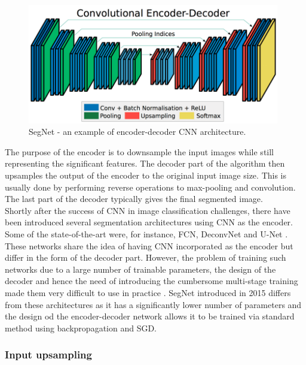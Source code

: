 \vspace{4mm}
\begin{figure}[h]
	\begin{center}
		\includegraphics*[width=11cm, keepaspectratio]{obr/segnet.png}
	\end{center}
	\vspace{4mm}
	\caption{SegNet - an example of encoder-decoder CNN architecture. \cite{segnet}} 
	\label{encoder}
\end{figure}

The purpose of the encoder is to downsample the input images while still representing the significant features. The decoder part of the algorithm then upsamples the output of the encoder to the original input image size. This is usually done by performing reverse operations to max-pooling and convolution. The last part of the decoder typically gives the final segmented image. \\

Shortly after the success of CNN in image classification challenges, there have been introduced several segmentation architectures using CNN as the encoder. Some of the state-of-the-art were, for instance, FCN, DeconvNet and U-Net \cite{segnet}. These networks share the idea of having CNN incorporated as the encoder but differ in the form
of the decoder part. However, the problem of training such networks due to a large number of trainable parameters, the design of the decoder and hence the need of introducing the cumbersome multi-stage training made them very difficult to use in practice \cite{segnet}. SegNet \cite{segnet} introduced in 2015 differs from these architectures as it has a significantly lower number of parameters and the design od the encoder-decoder network allows it to be trained via standard method using backpropagation and SGD.

\subsubsection{Input upsampling}

